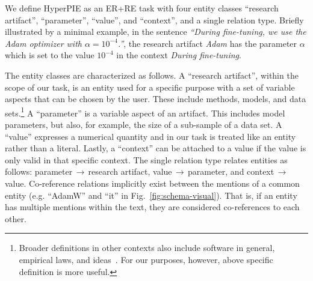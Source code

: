 We define HyperPIE as an ER+RE task with four entity classes ``research artifact'', ``parameter'', ``value'', and ``context'', and a single relation type. Briefly illustrated by a minimal example, in the sentence \textit{``During fine-tuning, we use the Adam optimizer with $\mathit{\alpha=10^{-4}}$.''}, the research artifact \textit{Adam} has the parameter $\mathit{\alpha}$ which is set to the value $\mathit{10^{-4}}$ in the context \textit{During fine-tuning}.

The entity classes are characterized as follows. A ``research artifact'', within the scope of our task, is an entity used for a specific purpose with a set of variable aspects that can be chosen by the user. These include methods, models, and data sets.\footnote{Broader definitions in other contexts also include software in general, empirical laws, and ideas~\cite{Lin2022}. For our purposes, however, above specific definition is more useful.} A ``parameter'' is a variable aspect of an artifact. This includes model parameters, but also, for example, the size of a sub-sample of a data set. A ``value'' expresses a numerical quantity and in our task is treated like an entity rather than a literal. Lastly, a ``context'' can be attached to a value if the value is only valid in that specific context. The single relation type relates entities as follows: parameter\,$\rightarrow$\,research artifact, value\,$\rightarrow$\,parameter, and context\,$\rightarrow$\,value.
Co-reference relations %
implicitly exist between the mentions of a common entity (e.g. ``AdamW'' and ``it'' in Fig.~\ref{fig:schema-visual}). That is, if an entity has multiple mentions within the text, they are considered co-references to each other.





